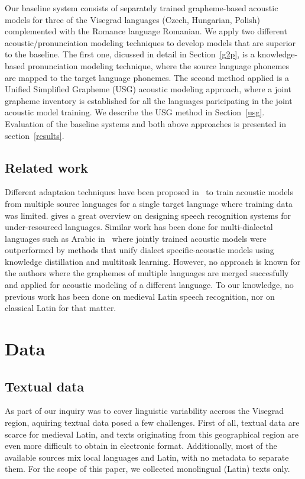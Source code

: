 \documentclass[runningheads,a4paper]{llncs}
\begin{document}
Our baseline system consists of separately trained grapheme-based acoustic models for three of the Visegrad languages (Czech, Hungarian, Polish) complemented with the Romance language Romanian.
We apply two different acoustic/pronunciation modeling techniques to develop models that are superior to the baseline.
The first one, dicussed in detail in Section~\ref{g2p}, is a knowledge-based pronunciation modeling technique, where the source language phonemes are mapped to the target language phonemes.
The second method applied is a Unified Simplified Grapheme (USG) acoustic modeling approach, where a joint grapheme inventory is established for all the languages paricipating in the joint acoustic model training.
We describe the USG method in Section~\ref{usg}.
Evaluation of the baseline systems and both above approaches is presented in section~\ref{results}.

\subsection{Related work}
Different adaptaion techniques have been proposed in~\cite{schultz01} to train acoustic models from multiple source languages for a single target language where training data was limited.
\cite{besacier14} gives a great overview on designing speech recognition systems for under-resourced languages.
Similar work has been done for multi-dialectal languages such as Arabic in~\cite{elfeky16} where jointly trained acoustic models were outperformed by methods that unify dialect specific-acoustic models using knowledge distillation and multitask learning.
However, no  approach is known for the authors where the graphemes of multiple languages are merged succesfully and applied for acoustic modeling of a different language.
To our knowledge, no previous work has been done on medieval Latin speech recognition, nor on classical Latin for that matter.

\section{Data}
\subsection{Textual data}\label{text}
As part of our inquiry was to cover linguistic variability accross the Visegrad region, aquiring textual data posed a few challenges.
First of all, textual data are scarce for medieval Latin, and texts originating from this geographical region are even more difficult to obtain in electronic format.
Additionally, most of the available sources mix local languages and Latin, with no metadata to separate them.
For the scope of this paper, we collected monolingual (Latin) texts only.
\end{document}
